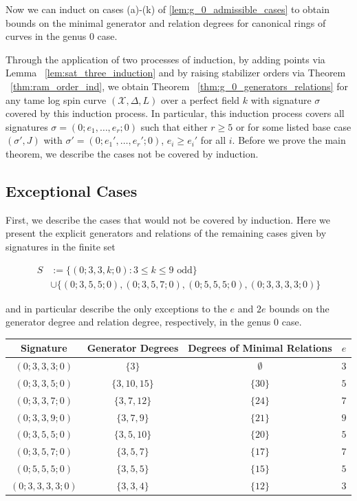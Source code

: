 \documentclass{amsart}
\theoremstyle{plain}
\theoremstyle{definition}
\theoremstyle{remark}
\numberwithin{equation}{section}
\newcommand\ssec{\subsection}
\newcommand \sx{\mathscr X}
\begin{document}
Now we can induct on cases (a)-(k) of \ref{lem:g_0_admissible_cases}
to obtain bounds on the minimal generator and relation degrees for
canonical rings of curves in the genus 0 case.

Through the application of two processes of induction, by adding 
points via Lemma ~\ref{lem:sat_three_induction} and by raising
stabilizer orders via Theorem ~\ref{thm:ram_order_ind},
we obtain Theorem ~\ref{thm:g_0_generators_relations} for any tame
log spin curve $(\sx, \Delta, L)$ over a perfect field $k$ with
signature $\sigma$ covered by this induction process.
In particular, this induction process covers all signatures $\sigma
= (0; e_1, \ldots, e_r; 0)$ such that either $r \geq 5$ or
for some listed base case $(\sigma', J)$ with $\sigma' = (0; e_1',
\ldots, e_r'; 0)$, $e_i \geq e_i'$ for all $i$.
Before we prove the main theorem, we describe the cases not be
covered by induction.

\ssec{Exceptional Cases}
\label{ssec:g_0_exceptional}
First, we describe the cases that would not be covered by induction.
Here we present the explicit generators and relations of the remaining
cases given by signatures in the finite set

\begin{align*}
	S &:= \{(0; 3, 3, k; 0) : 3 \leq k \leq 9 \text{ odd}\} \\
		&\cup \{(0; 3, 5, 5; 0) ,(0; 3, 5, 7; 0), (0; 5, 5, 5; 0), (0; 3, 3, 3, 3; 0)\}
\end{align*}

\noindent
and in particular describe the only exceptions to the $e$ and $2e$
bounds on the generator degree and relation degree, respectively,
in the genus 0 case.

\begin{longtable}
	{| c || c | c | c |}
	\hline
	Signature & Generator Degrees & Degrees of Minimal Relations & $e$ \\
	\hline
	\hline

	$(0; 3, 3, 3; 0)$ & $\{3\}$ & $\emptyset$ & $3$ \\	\hline

	$(0; 3, 3, 5; 0)$ & $\{3, 10, 15\}$ & $\{30\}$ & $5$ \\	\hline
	
	$(0; 3, 3, 7; 0)$ & $\{3, 7, 12\}$ & $\{24\}$ & $7$ \\	\hline
	
	$(0; 3, 3, 9; 0)$ & $\{3, 7, 9\}$ & $\{21\}$ & $9$ \\	\hline
	
	$(0; 3, 5, 5; 0)$ & $\{3, 5, 10\}$ & $\{20\}$ & $5$ \\	\hline
	
	$(0; 3, 5, 7; 0)$ & $\{3, 5, 7\}$ & $\{17\}$ & $7$ \\	\hline
	
	$(0; 5, 5, 5; 0)$ & $\{3, 5, 5\}$ & $\{15\}$ & $5$ \\	\hline
	
	$(0; 3, 3, 3, 3; 0)$ & $\{3, 3, 4\}$ & $\{12\}$ & $3$ \\	\hline
\end{longtable}
\end{document}
